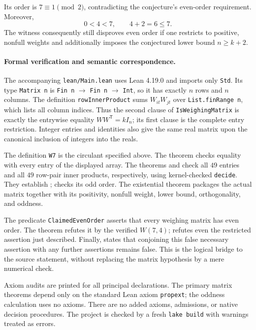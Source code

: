 \documentclass[10pt]{article}
\begin{document}
Its order is $7\equiv1\pmod2$, contradicting the conjecture's even-order requirement. Moreover,
\[
0<4<7,\qquad 4+2=6\le7.
\]
The witness consequently still disproves even order if one restricts to positive, nonfull weights and additionally imposes the conjectured lower bound $n\ge k+2$.

\newpage
\paragraph{Formal verification and semantic correspondence.}
The accompanying \texttt{lean/Main.lean} uses Lean 4.19.0 and imports only \texttt{Std}. Its type \texttt{Matrix n} is \texttt{Fin n} $\to$ \texttt{Fin n} $\to$ \texttt{Int}, so it has exactly $n$ rows and $n$ columns. The definition \texttt{rowInnerProduct} sums $W_{it}W_{jt}$ over \texttt{List.finRange n}, which lists all column indices. Thus the second clause of \texttt{IsWeighingMatrix} is exactly the entrywise equality $WW^{\mathsf T}=kI_n$; its first clause is the complete entry restriction. Integer entries and identities also give the same real matrix upon the canonical inclusion of integers into the reals.

The definition \texttt{W7} is the circulant specified above. The theorem  checks equality with every entry of the displayed array. The theorems  and  check all $49$ entries and all $49$ row-pair inner products, respectively, using kernel-checked \texttt{decide}. They establish ;  checks its odd order. The existential theorem  packages the actual matrix together with its positivity, nonfull weight, lower bound, orthogonality, and oddness.

The predicate \texttt{ClaimedEvenOrder} asserts that every weighing matrix has even order. The theorem  refutes it by the verified $W(7,4)$;  refutes even the restricted assertion just described. Finally,  states that conjoining this false necessary assertion with any further assertions remains false. This is the logical bridge to the source statement, without replacing the matrix hypothesis by a mere numerical check.

Axiom audits are printed for all principal declarations. The primary matrix theorems depend only on the standard Lean axiom \texttt{propext}; the oddness calculation uses no axioms. There are no added axioms, admissions, or native decision procedures. The project is checked by a fresh \texttt{lake build} with warnings treated as errors.
\end{document}
